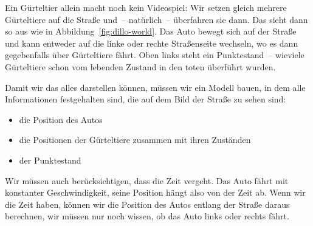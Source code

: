 Ein Gürteltier allein macht noch kein Videospiel: Wir setzen gleich
mehrere Gürteltiere auf die Straße und~-- natürlich~-- überfahren sie
dann.  Das sieht dann so aus wie in
Abbildung~\ref{fig:dillo-world}. Das Auto bewegt sich auf der Straße
und kann entweder auf die linke oder rechte Straßenseite wechseln, wo
es dann gegebenfalls über Gürteltiere fährt.  Oben links steht ein
Punktestand~-- wieviele Gürteltiere schon vom lebenden Zustand in den
toten überführt wurden.

Damit wir das alles darstellen können, müssen wir ein Modell bauen,
in dem alle Informationen festgehalten sind, die auf dem Bild der
Straße zu sehen sind:
%
\begin{itemize}
\item die Position des Autos
\item die Positionen der Gürteltiere zusammen mit ihren Zuständen
\item der Punktestand
\end{itemize}
%
Wir müssen auch berücksichtigen, dass die Zeit vergeht.  Das Auto
fährt mit konstanter Geschwindigkeit, seine Position hängt also von
der Zeit ab.  Wenn wir die Zeit haben, können wir die Position des
Autos entlang der Straße daraus berechnen, wir müssen nur noch wissen,
ob das Auto links oder rechts fährt.

